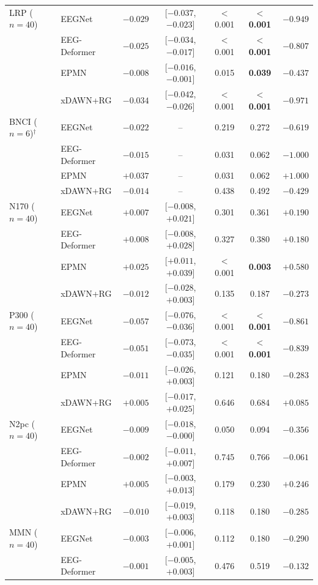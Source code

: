 \begin{table}[t]
\begin{tabular}{llccccc}
\midrule
LRP ($n{=}40$) & EEGNet & $-0.029$ & [$-0.037$, $-0.023$] & $<$0.001 & \textbf{$<$0.001} & $-0.949$ \\
 & EEG-Deformer & $-0.025$ & [$-0.034$, $-0.017$] & $<$0.001 & \textbf{$<$0.001} & $-0.807$ \\
 & EPMN & $-0.008$ & [$-0.016$, $-0.001$] & 0.015 & \textbf{0.039} & $-0.437$ \\
 & xDAWN+RG & $-0.034$ & [$-0.042$, $-0.026$] & $<$0.001 & \textbf{$<$0.001} & $-0.971$ \\
\midrule
BNCI ($n{=}6$)$^\dagger$ & EEGNet & $-0.022$ & -- & 0.219 & 0.272 & $-0.619$ \\
 & EEG-Deformer & $-0.015$ & -- & 0.031 & 0.062 & $-1.000$ \\
 & EPMN & $+0.037$ & -- & 0.031 & 0.062 & $+1.000$ \\
 & xDAWN+RG & $-0.014$ & -- & 0.438 & 0.492 & $-0.429$ \\
\midrule
N170 ($n{=}40$) & EEGNet & $+0.007$ & [$-0.008$, $+0.021$] & 0.301 & 0.361 & $+0.190$ \\
 & EEG-Deformer & $+0.008$ & [$-0.008$, $+0.028$] & 0.327 & 0.380 & $+0.180$ \\
 & EPMN & $+0.025$ & [$+0.011$, $+0.039$] & $<$0.001 & \textbf{0.003} & $+0.580$ \\
 & xDAWN+RG & $-0.012$ & [$-0.028$, $+0.003$] & 0.135 & 0.187 & $-0.273$ \\
\midrule
P300 ($n{=}40$) & EEGNet & $-0.057$ & [$-0.076$, $-0.036$] & $<$0.001 & \textbf{$<$0.001} & $-0.861$ \\
 & EEG-Deformer & $-0.051$ & [$-0.073$, $-0.035$] & $<$0.001 & \textbf{$<$0.001} & $-0.839$ \\
 & EPMN & $-0.011$ & [$-0.026$, $+0.003$] & 0.121 & 0.180 & $-0.283$ \\
 & xDAWN+RG & $+0.005$ & [$-0.017$, $+0.025$] & 0.646 & 0.684 & $+0.085$ \\
\midrule
N2pc ($n{=}40$) & EEGNet & $-0.009$ & [$-0.018$, $-0.000$] & 0.050 & 0.094 & $-0.356$ \\
 & EEG-Deformer & $-0.002$ & [$-0.011$, $+0.007$] & 0.745 & 0.766 & $-0.061$ \\
 & EPMN & $+0.005$ & [$-0.003$, $+0.013$] & 0.179 & 0.230 & $+0.246$ \\
 & xDAWN+RG & $-0.010$ & [$-0.019$, $+0.003$] & 0.118 & 0.180 & $-0.285$ \\
\midrule
MMN ($n{=}40$) & EEGNet & $-0.003$ & [$-0.006$, $+0.001$] & 0.112 & 0.180 & $-0.290$ \\
 & EEG-Deformer & $-0.001$ & [$-0.005$, $+0.003$] & 0.476 & 0.519 & $-0.132$ \\

\end{tabular}
\end{table}
